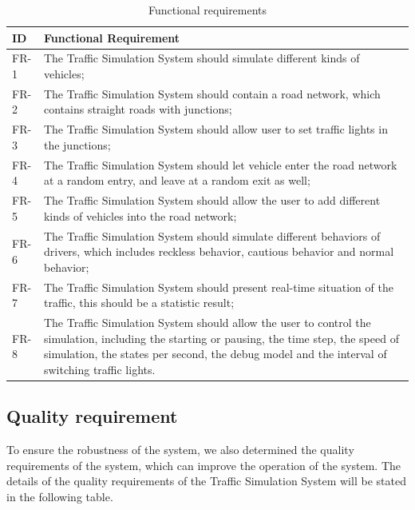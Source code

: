 \documentclass[a4paper,12pt]{article}
\begin{document}
\begin{table}[!htbp]
\centering
\label{versiontable}
\caption{Functional requirements}
\begin{tabular}{|p{1.5cm}|p{11cm}|}
\hline
ID & Functional Requirement\\
\hline
FR-1& The Traffic Simulation System should simulate different kinds of vehicles;\\
\hline
FR-2& The Traffic Simulation System should contain a road network, which contains straight roads with junctions;\\
\hline
FR-3& The Traffic Simulation System should allow user to set traffic lights in the junctions;\\
\hline
FR-4& The Traffic Simulation System should let vehicle enter the road network at a random entry, and leave at a random exit as well;\\
\hline
FR-5& The Traffic Simulation System should allow the user to add different kinds of vehicles into the road network;\\
\hline
FR-6& The Traffic Simulation System should simulate different behaviors of drivers, which includes reckless behavior, cautious behavior and normal behavior;\\
\hline
FR-7& The Traffic Simulation System should present real-time situation of the traffic, this should be a statistic result;\\
\hline
FR-8& The Traffic Simulation System should allow the user to control the simulation, including the starting or pausing, the time step, the speed of simulation, the states per second, the debug model and the interval of switching traffic lights.\\
\hline
\end{tabular}
\end{table}

\subsection{Quality requirement} To ensure the robustness of the system, we also determined the quality requirements of the system, which can improve the operation of the system. The details of the quality requirements of the Traffic Simulation System will be stated in the following table.
\end{document}
